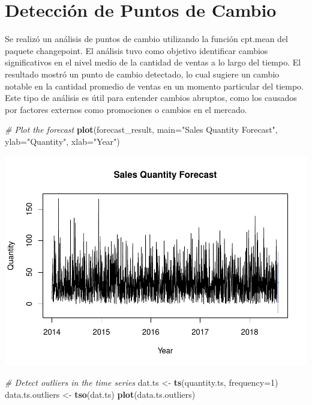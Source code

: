 \documentclass[
]{book}
\newenvironment{Shaded}{\begin{snugshade}}{\end{snugshade}}
\newcommand{\AttributeTok}[1]{\textcolor[rgb]{0.13,0.29,0.53}{#1}}
\newcommand{\CommentTok}[1]{\textcolor[rgb]{0.56,0.35,0.01}{\textit{#1}}}
\newcommand{\DecValTok}[1]{\textcolor[rgb]{0.00,0.00,0.81}{#1}}
\newcommand{\FunctionTok}[1]{\textcolor[rgb]{0.13,0.29,0.53}{\textbf{#1}}}
\newcommand{\NormalTok}[1]{#1}
\newcommand{\OtherTok}[1]{\textcolor[rgb]{0.56,0.35,0.01}{#1}}
\newcommand{\StringTok}[1]{\textcolor[rgb]{0.31,0.60,0.02}{#1}}
\begin{document}
\section{Detección de Puntos de Cambio}\label{detecciuxf3n-de-puntos-de-cambio-1}

Se realizó un análisis de puntos de cambio utilizando la función cpt.mean del paquete changepoint. El análisis tuvo como objetivo identificar cambios significativos en el nivel medio de la cantidad de ventas a lo largo del tiempo. El resultado mostró un punto de cambio detectado, lo cual sugiere un cambio notable en la cantidad promedio de ventas en un momento particular del tiempo. Este tipo de análisis es útil para entender cambios abruptos, como los causados por factores externos como promociones o cambios en el mercado.

\begin{Shaded}
\begin{Highlighting}[]
\CommentTok{\# Plot the forecast}
\FunctionTok{plot}\NormalTok{(forecast\_result, }\AttributeTok{main=}\StringTok{"Sales Quantity Forecast"}\NormalTok{, }\AttributeTok{ylab=}\StringTok{"Quantity"}\NormalTok{, }\AttributeTok{xlab=}\StringTok{"Year"}\NormalTok{)}
\end{Highlighting}
\end{Shaded}

\includegraphics{_main_files/figure-latex/unnamed-chunk-39-1.pdf}

\begin{Shaded}
\begin{Highlighting}[]
\CommentTok{\# Detect outliers in the time series}
\NormalTok{dat.ts }\OtherTok{\textless{}{-}} \FunctionTok{ts}\NormalTok{(quantity.ts, }\AttributeTok{frequency=}\DecValTok{1}\NormalTok{)}
\NormalTok{data.ts.outliers }\OtherTok{\textless{}{-}} \FunctionTok{tso}\NormalTok{(dat.ts)}
\FunctionTok{plot}\NormalTok{(data.ts.outliers)}
\end{Highlighting}
\end{Shaded}
\end{document}
